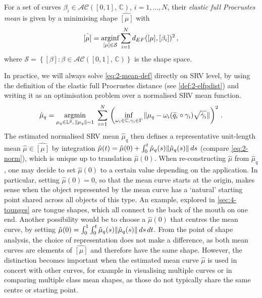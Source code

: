 \begin{definition}
  \label{def:2-mean}
  For a set of curves $\beta_i \in \mathcal{AC}([0,1],\, \mathbb{C})$, $i = 1,\dots,N$,  their \emph{elastic full Procrustes mean} is given by a minimising shape $\hat{[\mu]}$ with
  \begin{equation}
    \label{eq:2-mean-def}
    \hat{[\mu]} = \operatorname*{arginf}_{[\mu] \in \mathcal{S}} \sum_{i=1}^N d_{EF}([\mu], [\beta_i])^2\,,
  \end{equation}
  where $\mathcal{S} = \left\{ [\beta] : \beta \in \mathcal{AC}([0,1],\,\mathbb{C}) \right\}$ is the shape space.
\end{definition}

\noindent In practice, we will always solve \cref{eq:2-mean-def} directly on SRV level, by using the definition of the elastic full Procrustes distance (see \cref{def:2-elfpdist}) and writing it as an optimisation problem over a normalised SRV mean function.
\begin{equation}
  \label{eq:2-mean-def-srv}
  \hat\mu_q = \operatorname*{argmin}_{\mu_q \in \mathbb{L}^2,\,\lVert\mu_q\rVert = 1}\,\,
  \sum_{i=1}^N \, \left( \inf_{\omega_i \in \mathbb{C}, \gamma_i \in \Gamma} \,
    \lVert\mu_q - \omega_i (\widetilde q_i \circ \gamma_i) \sqrt{\dot\gamma_i}\rVert \right)^2\,.
\end{equation}
The estimated normalised SRV mean $\hat{\mu}_q$ then defines a representative unit-length mean $\hat{\mu} \in \hat{[\mu]}$ by integration $\hat\mu(t) = \hat\mu(0) + \int_0^t \hat\mu_q(s) \lVert\hat\mu_q(s)\rVert\,ds$ (compare \cref{eq:2-norm}), which is unique up to translation $\hat\mu(0)$.
When re-constructing $\hat\mu$ from $\hat\mu_q$, one may decide to set $\hat\mu(0)$ to a certain value depending on the application.
In particular, setting $\hat\mu(0) = 0$, so that the mean curve starts at the origin, makes sense when the object represented by the mean curve has a \enquote*{natural} starting point shared across all objects of this type.
An example, explored in \cref{sec:4-tounges} are tongue shapes, which all connect to the back of the mouth on one end.
Another possibility would be to choose a $\hat\mu(0)$ that centres the mean curve, by setting $\hat\mu(0) = \int_0^1 \int_0^t \hat\mu_q(s) \lVert \hat\mu_q(s)\rVert\,ds\,dt$.
From the point of shape analysis, the choice of representation does not make a difference, as both mean curves are elements of $\hat{[\mu]}$ and therefore have the same shape.
However, the distinction becomes important when the estimated mean curve $\hat\mu$ is used in concert with other curves, for example in visualising multiple curves or in comparing multiple class mean shapes, as those do not typically share the same centre or starting point.

